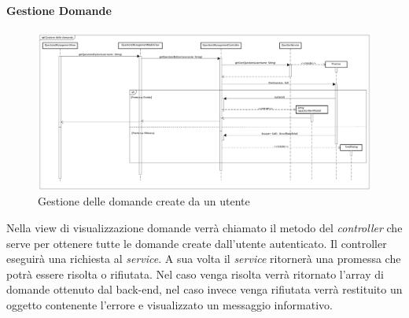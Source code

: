 \paragraph{Gestione Domande}

\label{Gestione delle domande create da un utente}

\begin{figure}[ht]
	\centering
	\includegraphics[scale=0.25,keepaspectratio]{UML/DiagrammiDiSequenza/Front-end/QuestionsManagement.png}
	\caption{Gestione delle domande create da un utente}
\end{figure} \FloatBarrier

Nella view di visualizzazione domande verrà chiamato il metodo del \textit{controller} che serve per ottenere tutte le domande create dall'utente autenticato. Il controller eseguirà una richiesta al \textit{service}. A sua volta il \textit{service} ritornerà una promessa che potrà essere risolta o rifiutata. Nel caso venga risolta verrà ritornato l'array di domande ottenuto dal back-end, nel caso invece venga rifiutata verrà restituito un oggetto contenente l'errore e visualizzato un messaggio informativo. 